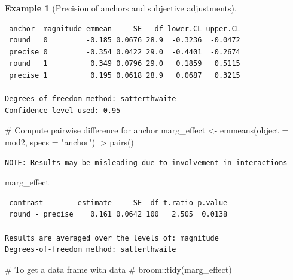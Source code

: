 \documentclass[
  11pt,
  letterpaper,
]{scrbook}
\newenvironment{Shaded}{\begin{snugshade}}{\end{snugshade}}
\newcommand{\AttributeTok}[1]{\textcolor[rgb]{0.40,0.45,0.13}{#1}}
\newcommand{\CommentTok}[1]{\textcolor[rgb]{0.37,0.37,0.37}{#1}}
\newcommand{\FunctionTok}[1]{\textcolor[rgb]{0.28,0.35,0.67}{#1}}
\newcommand{\NormalTok}[1]{\textcolor[rgb]{0.00,0.23,0.31}{#1}}
\newcommand{\OtherTok}[1]{\textcolor[rgb]{0.00,0.23,0.31}{#1}}
\newcommand{\SpecialCharTok}[1]{\textcolor[rgb]{0.37,0.37,0.37}{#1}}
\newcommand{\StringTok}[1]{\textcolor[rgb]{0.13,0.47,0.30}{#1}}
\theoremstyle{definition}
\newtheorem{example}{Example}[chapter]
\theoremstyle{definition}
\theoremstyle{remark}
\begin{document}
\begin{example}[Precision of anchors and subjective
adjustments]
\begin{verbatim}
 anchor  magnitude emmean     SE   df lower.CL upper.CL
 round   0         -0.185 0.0676 28.9  -0.3236  -0.0472
 precise 0         -0.354 0.0422 29.0  -0.4401  -0.2674
 round   1          0.349 0.0796 29.0   0.1859   0.5115
 precise 1          0.195 0.0618 28.9   0.0687   0.3215

Degrees-of-freedom method: satterthwaite 
Confidence level used: 0.95 
\end{verbatim}

\begin{Shaded}
\begin{Highlighting}[]
\CommentTok{\# Compute pairwise difference for anchor}
\NormalTok{marg\_effect }\OtherTok{\textless{}{-}} \FunctionTok{emmeans}\NormalTok{(}\AttributeTok{object =}\NormalTok{ mod2, }
        \AttributeTok{specs =} \StringTok{"anchor"}\NormalTok{) }\SpecialCharTok{|\textgreater{}} 
  \FunctionTok{pairs}\NormalTok{()}
\end{Highlighting}
\end{Shaded}

\begin{verbatim}
NOTE: Results may be misleading due to involvement in interactions
\end{verbatim}

\begin{Shaded}
\begin{Highlighting}[]
\NormalTok{marg\_effect}
\end{Highlighting}
\end{Shaded}

\begin{verbatim}
 contrast        estimate     SE  df t.ratio p.value
 round - precise    0.161 0.0642 100   2.505  0.0138

Results are averaged over the levels of: magnitude 
Degrees-of-freedom method: satterthwaite 
\end{verbatim}

\begin{Shaded}
\begin{Highlighting}[]
\CommentTok{\# To get a data frame with data}
\CommentTok{\# broom::tidy(marg\_effect)}
\end{Highlighting}
\end{Shaded}


\end{example}
\end{document}
